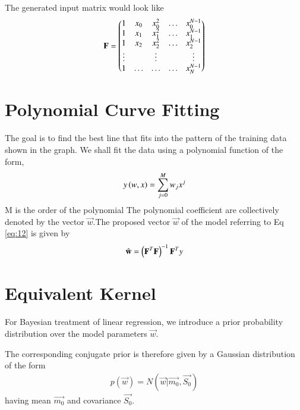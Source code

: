 \documentclass[journal,12pt,twocolumn]{IEEEtran}
\begin{document}
The generated input matrix would look like
\begin{align}
    \mathbf{F}= \begin{pmatrix} 1 & x_{0} & x_{0}^2 & \ldots & x_{0}^{N-1} \\
		1 & x_{1} & x_{1}^2 & \ldots & x_{1}^{N-1} \\
		1 & x_{2} & x_{2}^2 & \ldots & x_{2}^{N-1} \\
		\vdots & & \vdots &  & \vdots  \\
		    1 & \ldots & \ldots & \ldots & x_{N}^{N-1} \end{pmatrix}\label{eq:12}
\end{align}
\section{Polynomial Curve Fitting}
The goal is to find the best line that fits into the  pattern of the training data shown in the graph.
We shall fit the data using a polynomial function of the form, 
\begin{align}
     y\left(w,x\right)= \sum_{j=0}^{M} w_j x^{j}\\
\end{align}
M is the order of the polynomial
The polynomial coefficient are collectively denoted by the vector $\vec{w}$.The proposed vector $\vec{w}$ of the model referring to Eq \eqref{eq:12} is given by 
\begin{align}
    \hat{\mathbf{w}} = \left(\mathbf{F}^T\mathbf{F}\right)^{-1}\mathbf{F}^Ty \label{eq:13}
\end{align}

\section{Equivalent Kernel}
For Bayesian treatment of linear regression, we introduce a prior probability distribution over the model parameters $\vec{w}$.

The corresponding conjugate prior is therefore given by a Gaussian
distribution of the form
\begin{align}
    p(\vec{w}) = N(\vec{w} | \vec{m_{0}},\vec{S_{0}})
\end{align}
having mean $\vec{m_{0}}$ and covariance $\vec{S_{0}}$.
\end{document}
